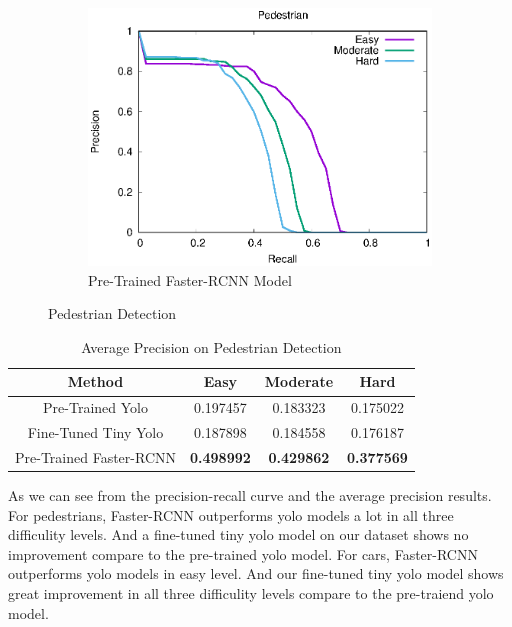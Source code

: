 \begin{figure}[H]
\begin{subfigure}{.34\textwidth}
    \includegraphics[width=1.0\linewidth]{img/FRCNN_Nov_8/plot_valid/pedestrian_detection.eps}
    \caption{Pre-Trained Faster-RCNN Model}
\end{subfigure}
\caption{Pedestrian Detection}
\end{figure}

\begin{table}[h!]
\centering
\begin{tabular}{ c | c | c | c }
\hline
Method & Easy & Moderate & Hard \\
\hline \hline
Pre-Trained Yolo & 0.197457 & 0.183323 & 0.175022 \\
Fine-Tuned Tiny Yolo & 0.187898 & 0.184558 & 0.176187 \\
Pre-Trained Faster-RCNN & \bfseries 0.498992 & \bfseries 0.429862 & \bfseries 0.377569 \\
\hline
\end{tabular}
\caption{Average Precision on Pedestrian Detection}
\end{table}

As we can see from the precision-recall curve and the average precision results. For pedestrians, Faster-RCNN outperforms yolo models a lot in all three difficulity levels. And a fine-tuned tiny yolo model on our dataset shows no improvement compare to the pre-trained yolo model. For cars, Faster-RCNN outperforms yolo models in easy level. And our fine-tuned tiny yolo model shows great improvement in all three difficulity levels compare to the pre-traiend yolo model.